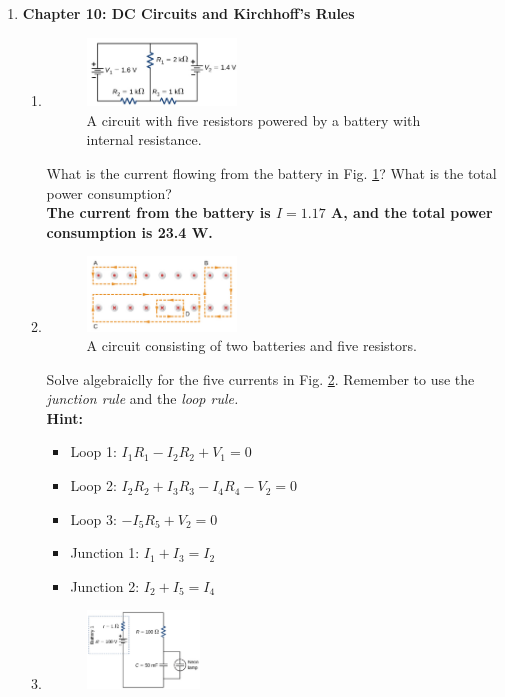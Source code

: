 \documentclass[10pt]{article}
\begin{document}
\begin{enumerate}
\item \textbf{Chapter 10: DC Circuits and Kirchhoff's Rules}
\begin{enumerate}
\item 
\begin{figure}[ht]
\centering
\includegraphics[width=0.4\textwidth]{circuit1.png}
\caption{\label{fig:circuit1} A circuit with five resistors powered by a battery with internal resistance.}
\end{figure}
What is the current flowing from the battery in Fig. \ref{fig:circuit1}?  What is the total power consumption? \\ \textbf{The current from the battery is $I = 1.17$ A, and the total power consumption is 23.4 W.}
\item 
\begin{figure}[ht]
\centering
\includegraphics[width=0.4\textwidth]{circuit2.png}
\caption{\label{fig:circuit2} A circuit consisting of two batteries and five resistors.}
\end{figure}
Solve algebraiclly for the five currents in Fig. \ref{fig:circuit2}.  Remember to use the \textit{junction rule} and the \textit{loop rule.} \\ \textbf{Hint:}
\begin{itemize}
\item Loop 1: $I_1 R_1 - I_2 R_2 + V_1 = 0$
\item Loop 2: $I_2 R_2 + I_3 R_3 - I_4 R_4 - V_2 = 0$
\item Loop 3: $-I_5 R_5 + V_2 = 0$
\item Junction 1: $I_1 + I_3 = I_2$
\item Junction 2: $I_2 + I_5 = I_4$
\end{itemize}
\item 
\begin{figure}[ht]
\centering
\includegraphics[width=0.3\textwidth]{circuit3.png}

\end{figure}
\end{enumerate}
\end{enumerate}
\end{document}
